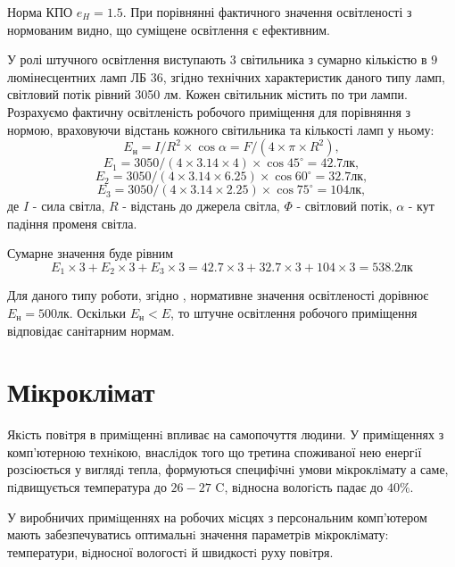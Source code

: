 Норма КПО $e_H = 1.5$.
При порівнянні фактичного значення освітленості з нормованим видно,
що суміщене освітлення є ефективним.

У ролі штучного освітлення виступають $3$ світильника з сумарно кількістю в
$9$ люмінесцентних ламп ЛБ 36, згідно технічних характеристик даного типу ламп,
світловий потік рівний 3050 лм.
Кожен світильник містить по три  лампи. 
Розрахуємо фактичну освітленість робочого приміщення для порівняння з нормою,
враховуючи відстань кожного світильника та кількості ламп у ньому:
\begin{equation*}
  E_{\text{н}} = I/R^{2} \times \cos\alpha = F/(4 \times \pi \times R^{2} ),
\end{equation*}
\begin{equation*}
  E_{1} = 3050/(4\times 3.14\times 4)\times \cos{45^{\circ}} = 42.7 \text{лк},
\end{equation*}
\begin{equation*}
  E_{2} = 3050/(4\times 3.14\times 6.25)\times \cos{60^{\circ}} = 32.7\text{лк},
\end{equation*}
\begin{equation*}
  E_{3} = 3050/(4\times 3.14\times 2.25)\times \cos{75^{\circ}} = 104 \text{лк},
\end{equation*}
де $I$ - сила світла, $R$ - відстань до джерела світла, 
$\Phi$ - світловий потік, $\alpha$ - кут падіння променя світла.

Сумарне значення буде рівним
\begin{equation*}
  E_1 \times 3 + E_2 \times 3 + E_3 \times 3
  = 42.7 \times 3 + 32.7 \times 3 + 104 \times 3
  = 538.2 \text{лк}
\end{equation*}

Для даного типу роботи, згідно \cite{DBN}, нормативне значення освітленості
дорівнює $E_{\text{н}} = 500$лк. 
Оскільки $E_{\text{н}} < E$, то штучне освітлення робочого приміщення
відповідає санітарним нормам.

\section{Мікроклімат}

Якiсть повiтря в примiщеннi впливає на самопочуття людини.
У примiщеннях з комп’ютерною технiкою, внаслiдок того що третина споживаної нею
енергiї розсiюється у виглядi тепла, формуються специфiчнi умови мiкроклiмату
а саме, пiдвищується температура до $26-27$ C,
вiдносна вологiсть падає до $40\%$.

У виробничих примiщеннях на робочих мiсцях з персональним комп’ютером мають
забезпечуватись оптимальнi значення параметрiв мiкроклiмату: температури,
вiдносної вологостi й швидкостi руху повiтря. \cite{DSanPiN}

